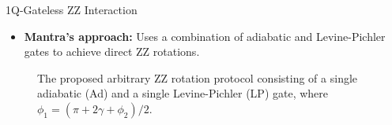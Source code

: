 \documentclass{beamer}
\begin{document}
	\begin{frame}{1Q-Gateless ZZ Interaction}
		\begin{itemize}
			\item \textbf{Mantra’s approach:} Uses a combination of adiabatic and Levine-Pichler gates to achieve direct ZZ rotations.
		\end{itemize}
		\centering
		\begin{figure}
			\caption[]{The proposed arbitrary ZZ rotation protocol consisting of a single adiabatic (Ad) and a single Levine-Pichler (LP) gate, where $\phi_1 = (\pi+2\gamma+\phi_2)/2$.}
		\end{figure}
	\end{frame}
\end{document}
